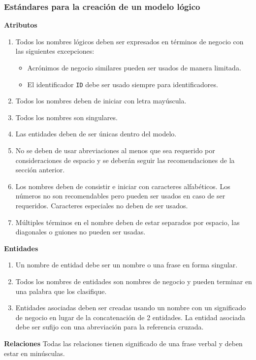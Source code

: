 \subsubsection{Estándares para la creación de un modelo lógico}
\textbf{Atributos}
\begin{enumerate}
\item Todos los nombres lógicos deben ser expresados en términos de negocio con las siguientes excepciones:
\begin{itemize}
\item Acrónimos de negocio similares pueden ser usados de manera limitada.
\item El identificador \texttt{ID} debe ser usado siempre para identificadores.
\end{itemize}

\item Todos los nombres deben de iniciar con letra mayúscula.
\item Todos los nombres son singulares.
\item Las entidades deben de ser únicas dentro del modelo.
\item No se deben de usar abreviaciones al menos que sea requerido por consideraciones de espacio y se deberán seguir las recomendaciones de la sección anterior.
\item Los nombres deben de consistir e iniciar con caracteres alfabéticos. Los números no son recomendables pero pueden ser usados en caso de ser requeridos. Caracteres especiales no deben de ser usados.
\item Múltiples términos en el nombre deben de estar separados por espacio, las diagonales o guiones no pueden ser usadas.
\end{enumerate}

\textbf{Entidades}
\begin{enumerate}
\item Un nombre de entidad debe ser un nombre o una frase en forma singular.
\item Todos los nombres de entidades son nombres de negocio y pueden terminar en una palabra que los clasifique.
\item Entidades asociadas deben ser creadas usando un nombre con un significado de negocio en lugar de la concatenación de 2 entidades. 
\iteem La entidad asociada debe ser sufijo con una abreviación para la referencia cruzada.
\end{enumerate}

\textbf{Relaciones}
Todas las relaciones tienen significado de una frase verbal y deben estar en minúsculas.

